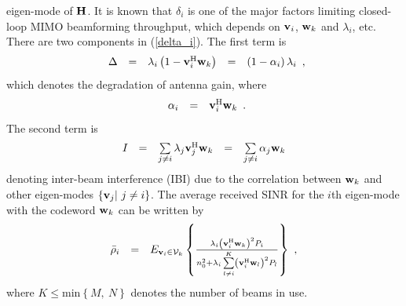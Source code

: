 \documentclass[10pt,fleqn, twocolumn]{IEEEtran}
\newcommand{\bH}{{\bf H}}
\newcommand{\bv}{{\bf v}}
\newcommand{\bw}{{\bf w}}
\begin{document}
eigen-mode of $\bH$. It is known that $\delta_{i}$ is one of the
major factors limiting closed-loop MIMO beamforming throughput,
which depends on $\bv_{i}$, $\bw_{k}$ and $\lambda_{i}$, etc.
There are two components in (\ref{delta_i}). The first term is
\begin{equation}
\begin{array}{rcccl}
\Delta&=&\lambda_{i}\left(1-\bv_{i}^{\rm
H}\bw_k\right)&=&\left(1-\alpha_{i}\right)\lambda_{i}
\end{array},
\end{equation}
\noindent which denotes the degradation of antenna gain, where
\begin{equation}
\begin{array}{rcl}
\alpha_{i}&=&\bv_{i}^{\rm H}\bw_k
\end{array}.\label{alpha}
\end{equation}
\noindent The second term is
\begin{equation}
\begin{array}{rcccl}
I_{} & = & \sum\limits_{j\neq i}\lambda_{j}\bv_{j}^{\rm
H}\bw_{k}&=&\sum\limits_{j\neq i}\alpha_{j}\bw_{k}
\end{array}\label{IBI}
\end{equation}
\noindent denoting inter-beam interference (IBI) due to the
correlation between $\bw_{k}$ and other eigen-modes
$\left\{\bv_{j}|\ j\neq i\right\}$. The average received SINR for
the $i$th eigen-mode with the codeword $\bw_{k}$ can be written by
\begin{equation}
\begin{array}{rcl}
\bar\rho_{i}&=&\mbox{E}_{\bv_{i}\in{\cal
V}_{k}}\left\{\frac{\lambda_{i}\left(\bv_{i}^{\rm
H}\bw_{k}\right)^2P_{i}}{n_{0}^2+ \lambda_{i}\sum\limits_{l\neq
i}^{K}\left(\bv_{i}^{\rm H}\bw_{l}\right)^{2}P_{l}}\right\}\ ,
\end{array}
\end{equation}
\noindent where $K\leq\mbox{min}\left\{M,\ N\right\}$ denotes the
number of beams in use.
\end{document}
